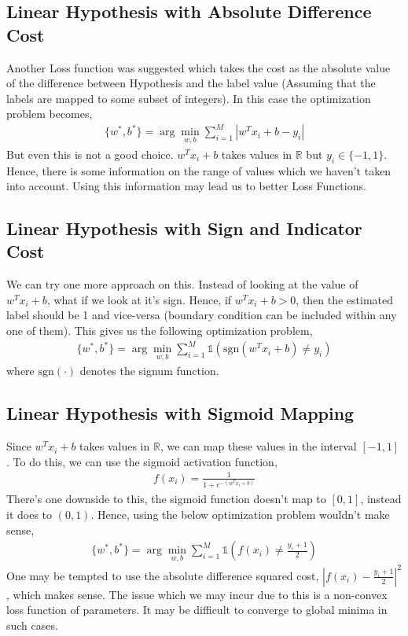 \documentclass[12pt]{article}
\begin{document}
\subsection{Linear Hypothesis with Absolute Difference Cost}
Another Loss function was suggested which takes the cost as the absolute value of the difference between Hypothesis and the label value (Assuming that the labels are mapped to some subset of integers). In this case the optimization problem becomes,
\begin{align*}
    \{w^{*}, b^{*}\} = \arg \min_{w,b} \sum_{i=1}^{M} |w^Tx_i+b - y_i| 
\end{align*}
But even this is not a good choice. $w^Tx_i + b$ takes values in $\mathbb{R}$ but $y_i \in \{-1,1\}$. Hence, there is some information on the range of values which we haven't taken into account. Using this information may lead us to better Loss Functions.

\subsection{Linear Hypothesis with Sign and Indicator Cost}
We can try one more approach on this. Instead of looking at the value of $w^Tx_i + b$, what if we look at it's sign. Hence, if $w^Tx_i+b > 0$, then the estimated label should be 1 and vice-versa (boundary condition can be included within any one of them). This gives us the following optimization problem,
\begin{align*}
    \{w^{*}, b^{*}\} = \arg\min_{w,b} \sum_{i=1}^{M} \mathds{1}(\text{sgn}(w^Tx_i+b) \ne y_i)
\end{align*}
where $\text{sgn}(\cdot)$ denotes the signum function.
\subsection{Linear Hypothesis with Sigmoid Mapping}
Since $w^Tx_i+b$ takes values in $\mathbb{R}$, we can map these values in the interval $[-1,1]$. To do this, we can use the sigmoid activation function,
\begin{align*}
    f(x_i) = \frac{1}{1+e^{-(w^Tx_i + b)}}
\end{align*}
There's one downside to this, the sigmoid function doesn't map to $[0,1]$, instead it does to $(0,1)$. Hence, using the below optimization problem wouldn't make sense,
\begin{align*}
    \{w^{*}, b^{*}\} = \arg\min_{w,b} \sum_{i=1}^{M} \mathds{1}(f(x_i) \ne \frac{y_i+1}{2}) 
\end{align*}
One may be tempted to use the absolute difference squared cost, $|f(x_i) - \frac{y_i+1}{2}|^2$, which makes sense. The issue which we may incur due to this is a non-convex loss function of parameters. It may be difficult to converge to global minima in such cases.\\
\newline
\end{document}
